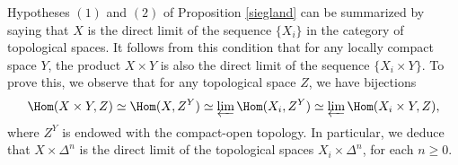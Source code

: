 \begin{remark}\label{stasis}
Hypotheses $(1)$ and $(2)$ of Proposition \ref{siegland} can be summarized by saying that
$X$ is the direct limit of the sequence $\{ X_i \}$ in the category of topological spaces.
It follows from this condition that for any locally compact space $Y$, the product
$X \times Y$ is also the direct limit of the sequence $\{ X_i \times Y \}$.
To prove this, we observe that for any topological space $Z$, we have bijections
$$ \Hom(X \times Y, Z)
\simeq \Hom(X, Z^Y) \simeq \varprojlim \Hom(X_i, Z^Y) \simeq \varprojlim \Hom(X_i \times Y, Z),$$
where $Z^Y$ is endowed with the compact-open topology. In particular, we deduce that
$X \times \Delta^n$ is the direct limit of the topological spaces $X_i \times \Delta^n$, for each $n \geq 0$.
\end{remark}

